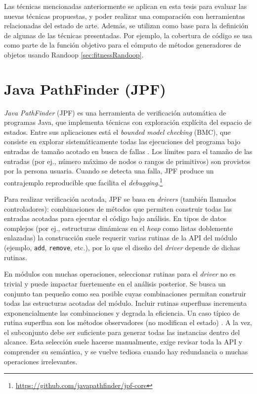 Las técnicas mencionadas anteriormente se aplican en esta tesis para evaluar las 
nuevas técnicas propuestas, y poder realizar una comparación con herramientas
relacionadas del estado de arte. Además, se utilizan como base para la
definición de algunas de las técnicas presentadas. Por ejemplo, la cobertura de
código se usa como parte de la función objetivo para el cómputo de métodos
generadores de objetos usando Randoop \ref{sec:fitnessRandoop}.


\section{Java PathFinder (JPF)}
\label{sec:jpf}

\emph{Java PathFinder} (JPF) es una herramienta de verificación automática de programas Java, que implementa técnicas con
exploración explícita del espacio de estados. Entre sus aplicaciones está el \emph{bounded model checking} (BMC), que
consiste en explorar sistemáticamente todas las ejecuciones del programa bajo entradas de tamaño acotado en busca de fallas
\cite{Visser05,Pasareanu:2010}. Los límites para el tamaño de las entradas (por ej., número máximo de nodos o rangos de primitivos)
son provistos por la persona usuaria. Cuando se detecta una falla, JPF produce un contrajemplo reproducible que facilita el
\emph{debugging}.\footnote{\url{https://github.com/javapathfinder/jpf-core}}

Para realizar verificación acotada, JPF se basa en \emph{drivers} (también llamados controladores): combinaciones de métodos que permiten construir todas las
entradas acotadas para ejecutar el código bajo análisis. En tipos de datos complejos (por ej., estructuras dinámicas en el \emph{heap}
como listas doblemente enlazadas) la construcción suele requerir varias rutinas de la API del módulo (ejemplo, \texttt{add},
\texttt{remove}, etc.), por lo que el diseño del \emph{driver} depende de dichas rutinas.

En módulos con muchas operaciones, seleccionar rutinas para el \emph{driver} no es trivial y puede impactar fuertemente en el
análisis posterior. Se busca un conjunto tan pequeño como sea posible cuyas combinaciones permitan construir todas las
estructuras acotadas del módulo. Incluir rutinas superfluas incrementa exponencialmente las combinaciones y degrada la
eficiencia. Un caso típico de rutina superflua son los métodos observadores (no modifican el estado) \cite{Huang:2012}. 
A la vez, el subconjunto debe ser suficiente para generar todas las instancias dentro del alcance. 
Esta selección suele hacerse manualmente, exige revisar toda la API y comprender su semántica, y se vuelve tediosa cuando
hay redundancia o muchas operaciones irrelevantes.


